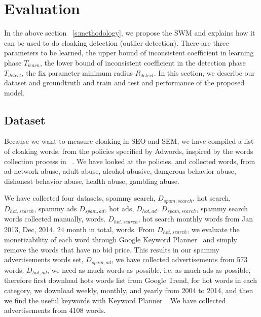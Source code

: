 \section{Evaluation}
\label{s:evaluation}



In the above section ~\autoref{s:methodology}, we propose the SWM and explains
how it can be used to do cloaking detection (outlier detection). There are three
parameters to be learned, the upper bound of inconsistent coefficient in
learning phase $T_{learn}$, the lower bound of inconsistent coefficient in the detection
phase $T_{detect}$, the fix parameter minimum radius $R_{detect}$. In this
section, we describe our dataset and groundtruth and train and test and
performance of the proposed model.

\subsection{Dataset}
Because we want to measure cloaking in SEO and SEM, we have compiled a list of
cloaking words, from the policies specified by Adwords, inspired by the words
collection process in ~\cite{wang2011cloak}. We have looked at the policies, and
collected  words, from ad network abuse, adult abuse, alcohol abusive, dangerous behavior
abuse, dishonest behavior abuse, health abuse, gambling abuse.

We have collected four datasets, spammy search, $D_{spam, search}$, hot search,
$D_{hot, search}$, spammy ads $D_{spam, ad}$, hot ads, $D_{hot, ad}$. 
$D_{spam, search}$, spammy search words collected manually,  words.
$D_{hot, search}$, hot search monthly words from Jan 2013, Dec, 2014, 24 month
in total,   words.
From $D_{hot, search}$, we evaluate the monetizability of each word through
Google Keyword Planner~\cite{keyword-planner} and simply
remove the words that have no bid price. This results in our spammy
advertisements words set, $D_{spam, ad}$, we have collected advertisements from 573 words.
$D_{hot, ad}$, we need as much words as possible, i.e. as much ads as possible,
therefore first download hots words list from Google Trend, for hot words in
each category, we download weekly, monthly, and yearly from 2004 to 2014, and
then we find the useful keywords with Keyword Planner~\cite{keyword-planner}.
We have collected advertisements from 4108 words.

